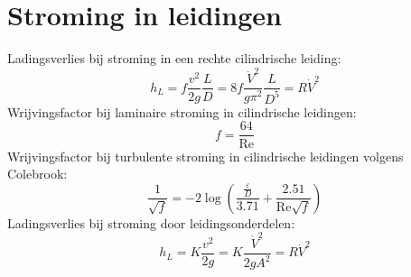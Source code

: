 	\section{Stroming in leidingen}
\begin{multicols}{2}
	Ladingsverlies bij stroming in een rechte cilindrische leiding:
	\begin{equation}
		h_L = f \frac{v^2}{2 g}\frac{L}{D} = 8 f \frac{\dot{V}^2}{g \pi^2}\frac{L}{D^5} = R \dot{V}^2
	\end{equation}
	Wrijvingsfactor bij laminaire stroming in cilindrische leidingen:
	\begin{equation}
		f = \frac{64}{\text{Re}}
	\end{equation}
	Wrijvingsfactor bij turbulente stroming in cilindrische leidingen volgens Colebrook:
	\begin{equation}
		\frac{1}{\sqrt{f}} = -2 \log \left( \frac{\frac{\varepsilon}{D}}{3.71}+\frac{2.51}{\text{Re}\sqrt{f}} \right)
	\end{equation}
	Ladingsverlies bij stroming door leidingsonderdelen:
	\begin{equation}
		h_L = K \frac{v^2}{2 g} = K \frac{\dot{V}^2}{2 g A^2} = R \dot{V}^2
	\end{equation}
\end{multicols}